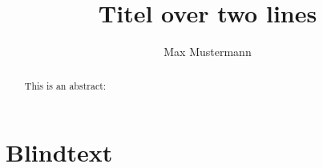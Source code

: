\documentclass[
11pt,twoside
]{scrartcl}
\title{Titel over two \newlineTitle lines}
\author{Max Mustermann}
\affiliation{Affiliation, \url{some@email.address}}
\begin{document}
\maketitle

\begin{abstract}%
This is an abstract: \lipsum[1]
\end{abstract}




\section{Blindtext}

\lipsum


\insertBib
\end{document}
